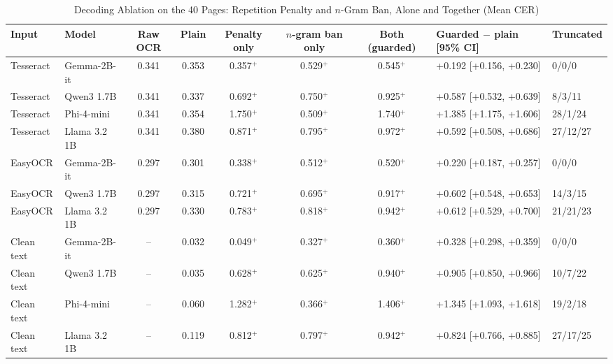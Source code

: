 \begin{table}[t]
\centering
\caption{Decoding Ablation on the 40 Pages: Repetition Penalty and $n$-Gram Ban, Alone and Together (Mean CER)}
\label{tab:decoding}
\setlength{\tabcolsep}{4pt}
\footnotesize
\begin{tabular}{llcccccll}
\toprule
Input & Model & Raw OCR & Plain & Penalty only & $n$-gram ban only & Both (guarded) & Guarded $-$ plain [95\% CI] & Truncated \\
\midrule
Tesseract & Gemma-2B-it & 0.341 & 0.353 & 0.357$^{+}$ & 0.529$^{+}$ & 0.545$^{+}$ & +0.192 [+0.156, +0.230] & 0/0/0 \\
Tesseract & Qwen3 1.7B & 0.341 & 0.337 & 0.692$^{+}$ & 0.750$^{+}$ & 0.925$^{+}$ & +0.587 [+0.532, +0.639] & 8/3/11 \\
Tesseract & Phi-4-mini & 0.341 & 0.354 & 1.750$^{+}$ & 0.509$^{+}$ & 1.740$^{+}$ & +1.385 [+1.175, +1.606] & 28/1/24 \\
Tesseract & Llama 3.2 1B & 0.341 & 0.380 & 0.871$^{+}$ & 0.795$^{+}$ & 0.972$^{+}$ & +0.592 [+0.508, +0.686] & 27/12/27 \\
\midrule
EasyOCR & Gemma-2B-it & 0.297 & 0.301 & 0.338$^{+}$ & 0.512$^{+}$ & 0.520$^{+}$ & +0.220 [+0.187, +0.257] & 0/0/0 \\
EasyOCR & Qwen3 1.7B & 0.297 & 0.315 & 0.721$^{+}$ & 0.695$^{+}$ & 0.917$^{+}$ & +0.602 [+0.548, +0.653] & 14/3/15 \\
EasyOCR & Llama 3.2 1B & 0.297 & 0.330 & 0.783$^{+}$ & 0.818$^{+}$ & 0.942$^{+}$ & +0.612 [+0.529, +0.700] & 21/21/23 \\
\midrule
Clean text & Gemma-2B-it & -- & 0.032 & 0.049$^{+}$ & 0.327$^{+}$ & 0.360$^{+}$ & +0.328 [+0.298, +0.359] & 0/0/0 \\
Clean text & Qwen3 1.7B & -- & 0.035 & 0.628$^{+}$ & 0.625$^{+}$ & 0.940$^{+}$ & +0.905 [+0.850, +0.966] & 10/7/22 \\
Clean text & Phi-4-mini & -- & 0.060 & 1.282$^{+}$ & 0.366$^{+}$ & 1.406$^{+}$ & +1.345 [+1.093, +1.618] & 19/2/18 \\
Clean text & Llama 3.2 1B & -- & 0.119 & 0.812$^{+}$ & 0.797$^{+}$ & 0.942$^{+}$ & +0.824 [+0.766, +0.885] & 27/17/25 \\
\bottomrule
\end{tabular}
\par\smallskip

\end{table}
